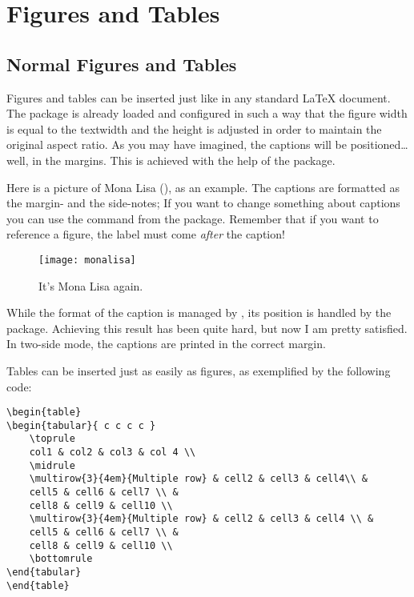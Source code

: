 \setchapterpreamble[u]{\margintoc}
\chapter[Figures and Tables]{Figures and Tables\footnotemark[0]}


\section{Normal Figures and Tables}

Figures and tables can be inserted just like in any standard 
\LaTeX\xspace document. The  package is already loaded 
and configured in such a way that the figure width is equal to the 
textwidth and the height is adjusted in order to maintain the original 
aspect ratio. As you may have imagined, the captions will be 
positioned\ldots well, in the margins. This is achieved with the help of 
the  package.

Here is a picture of Mona Lisa (), as an example. 
The captions are formatted as the margin- and the side-notes; If you 
want to change something about captions you can use the command 
 from the  package. Remember that if 
you want to reference a figure, the label must come \emph{after} the 
caption!

\begin{figure}[hb]
	\texttt{[image: monalisa]}
	\caption[Mona Lisa, again]{It's Mona Lisa again. \blindtext}
\end{figure}

While the format of the caption is managed by , its 
position is handled by the  package. Achieving this 
result has been quite hard, but now I am pretty satisfied. In two-side 
mode, the captions are printed in the correct margin.

Tables can be inserted just as easily as figures, as exemplified by the 
following code:

\begin{lstlisting}[caption={Caption of a listing.}]
\begin{table}
\begin{tabular}{ c c c c }
	\toprule
	col1 & col2 & col3 & col 4 \\
	\midrule
	\multirow{3}{4em}{Multiple row} & cell2 & cell3 & cell4\\ &
	cell5 & cell6 & cell7 \\ &
	cell8 & cell9 & cell10 \\
	\multirow{3}{4em}{Multiple row} & cell2 & cell3 & cell4 \\ &
	cell5 & cell6 & cell7 \\ &
	cell8 & cell9 & cell10 \\
	\bottomrule
\end{tabular}
\end{table}
\end{lstlisting}

